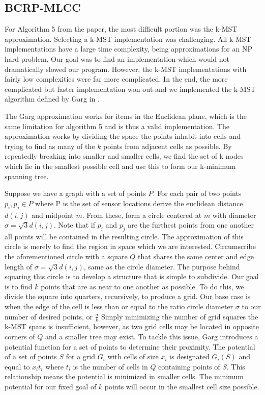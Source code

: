 \documentclass{article}
\begin{document}
\subsection{BCRP-MLCC}

For Algorithm 5 from the paper, the most difficult portion was the k-MST approximation.
Selecting a k-MST implementation was challenging.
All k-MST implementations have a large time complexity, being approximations for an NP hard problem.
Our goal was to find an implementation which would not dramatically slowed our program.
However, the k-MST implementations with fairly low complexities were far more complicated.
In the end, the more complicated but faster implementation won out and we implemented the k-MST algorithm defined by Garg in \cite{Garg1997}.

The Garg approximation works for items in the Euclidean plane, which is the same limitation for algorithm 5 and is thus a valid implementation.
The approximation works by dividing the space the points inhabit into cells and trying to find as many of the $k$ points from adjacent cells as possible.
By repeatedly breaking into smaller and smaller cells, we find the set of k nodes which lie in the smallest possible cell and use this to form our k-minimum spanning tree.

Suppose we have a graph with a set of points $P$.
For each pair of two points $p_i, p_j \in P$ where P is the set of sensor locations derive the euclidean distance $d(i,j)$ and midpoint $m$.
From these, form a circle centered at $m$ with diameter $\sigma = \sqrt{3}d(i,j)$.
Note that if $p_i$ and $p_j$ are the furthest points from one another all points will be contained in the resulting circle.
The approximation of this circle is merely to find the region in space which we are interested.
Circumscribe the aforementioned circle with a square $Q$ that shares the same center and edge length of $\sigma = \sqrt{3}d(i,j)$, same as the circle diameter.
The purpose behind squaring this circle is to develop a structure that is simple to subdivide.
Our goal is to find $k$ points that are as near to one another as possible.
To do this, we divide the square into quarters, recursively, to produce a grid.
Our base case is when the edge of the cell is less than or equal to the ratio circle diameter $\sigma$ to our number of desired points, or $\frac{\sigma}{k}$
Simply minimizing the number of grid squares the k-MST spans is insufficient, however, as two grid cells may be located in opposite corners of $Q$ and a smaller tree may exist.
To tackle this issue, Garg introduces a potential function for a set of points to determine their proximity.
The potential of a set of points $S$ for a grid $G_i$ with cells of size $x_i$ is designated $G_i(S)$ and equal to $x_it_i$ where $t_i$ is the number of cells in $Q$ containing points of $S$.
This relationship means the potential is minimized in smaller cells.
The minimum potential for our fixed goal of $k$ points will occur in the smallest cell size possible.
\end{document}
